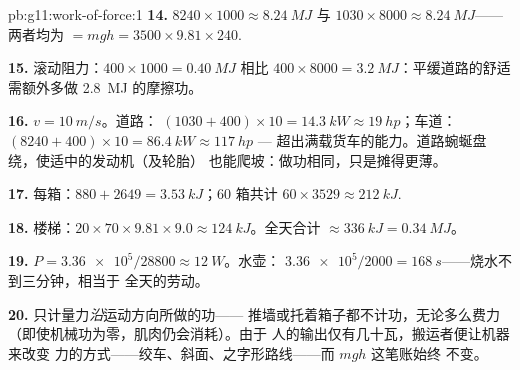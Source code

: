 \begin{solution}{pb:g11:work-of-force:1}
\textbf{14.} $8240 \times 1000 \approx \qty{8.24}{MJ}$ 与
$1030 \times 8000 \approx \qty{8.24}{MJ}$——两者均为 $= mgh = 3500
\times 9.81 \times 240$.

\textbf{15.} 滚动阻力：$400 \times 1000 = \qty{0.40}{MJ}$
相比 $400 \times 8000 = \qty{3.2}{MJ}$：平缓道路的舒适
需额外多做 \qty{2.8}{MJ} 的摩擦功。

\textbf{16.} $v = \qty{10}{m/s}$。道路：
$(1030 + 400) \times 10 = \qty{14.3}{kW} \approx \qty{19}{hp}$；车道：
$(8240 + 400) \times 10 = \qty{86.4}{kW} \approx \qty{117}{hp}$ ---
超出满载货车的能力。道路蜿蜒盘绕，使适中的发动机（及轮胎）
也能爬坡：做功相同，只是摊得更薄。

\textbf{17.} 每箱：$880 + 2649 = \qty{3.53}{kJ}$；$60$ 箱共计
$60 \times 3529 \approx \qty{212}{kJ}$.

\textbf{18.} 楼梯：$20 \times 70 \times 9.81 \times 9.0 \approx
\qty{124}{kJ}$。全天合计 $\approx \qty{336}{kJ} = \qty{0.34}{MJ}$。

\textbf{19.} $P = \num{3.36e5}/28800 \approx \qty{12}{W}$。水壶：
$\num{3.36e5}/2000 = \qty{168}{s}$——烧水不到三分钟，相当于
全天的劳动。

\textbf{20.} 只计量力\emph{沿}运动方向所做的功——
推墙或托着箱子都不计功，无论多么费力
（即使机械功为零，肌肉仍会消耗）。由于
人的输出仅有几十瓦，搬运者便让机器来改变
力的方式——绞车、斜面、之字形路线——而 $mgh$ 这笔账始终
不变。
\end{solution}
